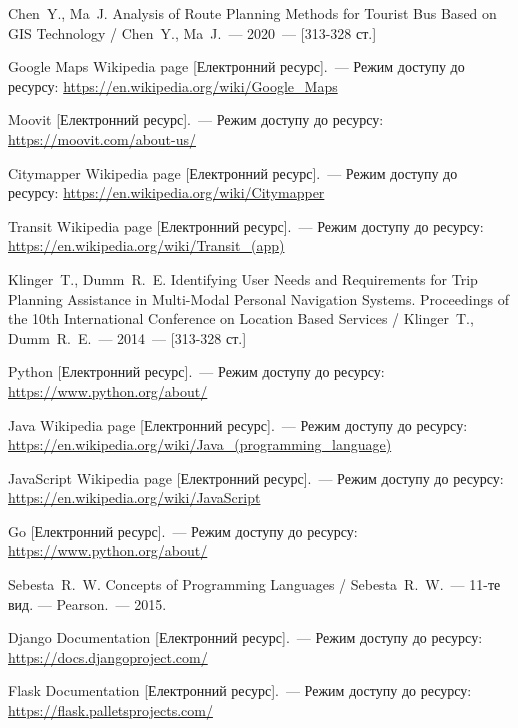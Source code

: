 \begin{thebibliography}
	 Chen~Y., Ma~J. Analysis of Route Planning Methods for Tourist Bus Based on GIS Technology / Chen~Y., Ma~J.~--- 2020~--- [313-328 ст.]
	

	 Google Maps Wikipedia page [Електронний ресурс].~--- Режим доступу до ресурсу:
	\url{https://en.wikipedia.org/wiki/Google_Maps}

	 Moovit [Електронний ресурс].~--- Режим доступу до ресурсу:
	\url{https://moovit.com/about-us/}

	 Citymapper Wikipedia page [Електронний ресурс].~--- Режим доступу до ресурсу:
	\url{https://en.wikipedia.org/wiki/Citymapper}


	 Transit Wikipedia page [Електронний ресурс].~--- Режим доступу до ресурсу:
	\url{https://en.wikipedia.org/wiki/Transit_(app)}
	


	 Klinger~T., Dumm~R.~E. Identifying User Needs and Requirements for Trip Planning Assistance in Multi-Modal Personal Navigation Systems. Proceedings of the 10th International Conference on Location Based Services / Klinger~T., Dumm~R.~E.~--- 2014~--- [313-328 ст.]



	 Python [Електронний ресурс].~--- Режим доступу до ресурсу:
	\url{https://www.python.org/about/}

	 Java Wikipedia page [Електронний ресурс].~--- Режим доступу до ресурсу:
	\url{https://en.wikipedia.org/wiki/Java_(programming_language)}

	 JavaScript Wikipedia page [Електронний ресурс].~--- Режим доступу до ресурсу:
	\url{https://en.wikipedia.org/wiki/JavaScript}

	 Go [Електронний ресурс].~--- Режим доступу до ресурсу:
	\url{https://www.python.org/about/}
	
	 Sebesta~R.~W.  Concepts of Programming Languages / Sebesta~R.~W.~--- 11-те вид. --- Pearson.~--- 2015.


	 Django Documentation [Електронний ресурс].~--- Режим доступу до ресурсу:
	\url{https://docs.djangoproject.com/}

	 Flask Documentation [Електронний ресурс].~--- Режим доступу до ресурсу:
	\url{https://flask.palletsprojects.com/}



\end{thebibliography}
